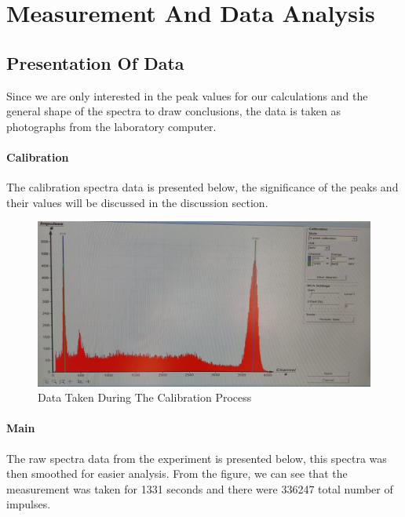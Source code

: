 \section{Measurement And Data Analysis}

	\subsection{Presentation Of Data}
		Since we are only interested in the peak values for our calculations and the general shape of the spectra to draw conclusions, the data is taken as photographs from the laboratory computer.
		\paragraph{Calibration}
			The calibration spectra data is presented below, the significance of the peaks and their values will be discussed in the discussion section.
		
			\begin{figure}[h]
				\caption{Data Taken During The Calibration Process}
				\centering
				\label{fig:CalibrationData}
				\includegraphics[width=\textwidth * 2/ 2]{images/calibration_spectra.png}
			\end{figure}
		
		\paragraph{Main}
		The raw spectra data from the experiment is presented below, this spectra was then smoothed for easier analysis. From the figure, we can see that the measurement was taken for 1331 seconds and there were 336247 total number of impulses.
		\\
		\\
		
